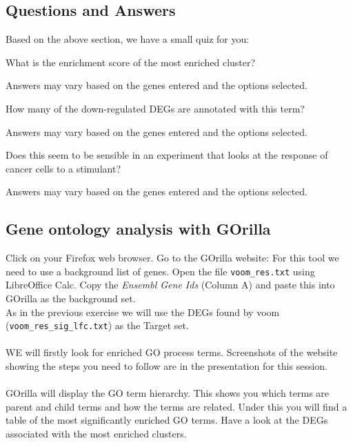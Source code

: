 \begin{Statistical tests used in Gene Ontology analysis}[style=multiline,labelindent=0cm,align=left,leftmargin=0.5cm]
\subsection{Questions and Answers}
Based on the above section, we have a small quiz for you:
\begin{questions}
What is the enrichment score of the most enriched cluster?
\begin{answer}
Answers may vary based on the genes entered and the options selected.
\end{answer}
How many of the down-regulated DEGs are annotated with this term? 
\begin{answer}
Answers may vary based on the genes entered and the options selected.
\end{answer}
Does this seem to be sensible in an experiment that looks at the response of cancer cells to a stimulant?
\begin{answer}
Answers may vary based on the genes entered and the options selected.
\end{answer}
\end{questions}

\subsection{Gene ontology analysis with GOrilla}

Click on your Firefox web browser.  Go to the GOrilla website: 
For this tool we need to use a background list of genes. Open the file \texttt{voom_res.txt} using LibreOffice Calc.  Copy the \emph{Ensembl Gene Ids} (Column A) and paste this into GOrilla as the background set.\\
As in the previous exercise we will use the DEGs found by voom (\texttt{voom_res_sig_lfc.txt}) as the Target set. \\\\
WE will firstly look for enriched GO process terms.  Screenshots of the website showing the steps you need to follow are in the presentation for this session.\\\\
GOrilla will display the GO term hierarchy. This shows you which terms are parent and child terms and how the terms are related.
Under this you will find a table of the most significantly enriched GO terms.  Have a look at the DEGs associated with the most enriched clusters.


\end{Statistical tests used in Gene Ontology analysis}
